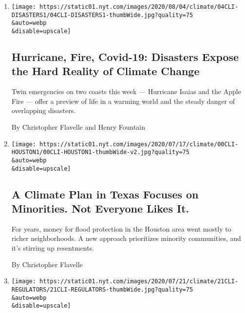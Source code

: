 \begin{enumerate}
\def\labelenumi{\arabic{enumi}.}
\item
  \href{/2020/08/04/climate/hurricane-isaias-apple-fire-climate.html}{}

  \texttt{[image: https://static01.nyt.com/images/2020/08/04/climate/04CLI-DISASTERS1/04CLI-DISASTERS1-thumbWide.jpg?quality=75\\\&auto=webp\\\&disable=upscale]}

  \hypertarget{hurricane-fire-covid-19-disasters-expose-the-hard-reality-of-climate-change}{%
  \subsection{Hurricane, Fire, Covid-19: Disasters Expose the Hard
  Reality of Climate
  Change}\label{hurricane-fire-covid-19-disasters-expose-the-hard-reality-of-climate-change}}

  Twin emergencies on two coasts this week --- Hurricane Isaias and the
  Apple Fire --- offer a preview of life in a warming world and the
  steady danger of overlapping disasters.

  By Christopher Flavelle and Henry Fountain
\item
  \href{/2020/07/24/climate/houston-flooding-race.html}{}

  \texttt{[image: https://static01.nyt.com/images/2020/07/17/climate/00CLI-HOUSTON1/00CLI-HOUSTON1-thumbWide-v2.jpg?quality=75\\\&auto=webp\\\&disable=upscale]}

  \hypertarget{a-climate-plan-in-texas-focuses-on-minorities-not-everyone-likes-it}{%
  \subsection{A Climate Plan in Texas Focuses on Minorities. Not
  Everyone Likes
  It.}\label{a-climate-plan-in-texas-focuses-on-minorities-not-everyone-likes-it}}

  For years, money for flood protection in the Houston area went mostly
  to richer neighborhoods. A new approach prioritizes minority
  communities, and it's stirring up resentments.

  By Christopher Flavelle
\item
  \href{/2020/07/21/climate/investors-climate-threat-regulators.html}{}

  \texttt{[image: https://static01.nyt.com/images/2020/07/21/climate/21CLI-REGULATORS/21CLI-REGULATORS-thumbWide.jpg?quality=75\\\&auto=webp\\\&disable=upscale]}

  \hypertarget{climate-change-poses-systemic-threat-to-the-economy-big-investors-warn}{%
}
\end{enumerate}
